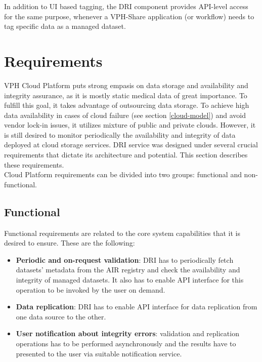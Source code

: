 In addition to UI based tagging, the DRI component provides API-level access
for the same purpose, whenever a VPH-Share application (or workflow) needs to
tag specific data as a managed dataset.

\section{Requirements}
\label{requirements}
VPH Cloud Platform puts strong empasis on data storage and availability and
integrity assurance, as it is mostly static medical data of great importance.
To fulfill this goal, it takes advantage of outsourcing data storage. To
achieve high data availability in cases of cloud failure (see section
\ref{cloud-model}) and avoid vendor lock-in issues, it utilizes mixture of
public and private clouds. However, it is still desired to monitor periodically
the availability and integrity of data deployed at cloud storage services. DRI
service was designed under several crucial requirements that dictate its
architecture and potential. This section describes these requirements.\\
	
Cloud Platform requirements can be divided into two groups: functional and
non-functional.

\subsection{Functional}
Functional requirements are related to the core system capabilities that it
is desired to ensure. These are the following:

\begin{itemize}
	\item \textbf{Periodic and on-request validation}: DRI has to periodically
	fetch datasets' metadata from the AIR registry and check the availability
	and integrity of managed datasets. It also has to enable API interface for
	this operation to be invoked by the user on demand.
	\item \textbf{Data replication}: DRI has to enable API interface for data
	replication from one data source to the other. 
	\item \textbf{User notification about integrity errors}: validation and
	replication operations has to be performed asynchronously and the results
	have to presented to the user via suitable notification service.
\end{itemize}

